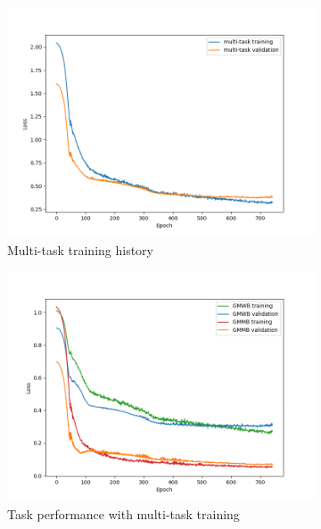 \begin{figure}[ht!]
    \centering
    \begin{subfigure}{0.48\textwidth}
        \includegraphics[width=\textwidth]{./project3/figures/figure5a.png}
        \caption{Multi-task training history} 
        \label{subfig3-5:multiTask}
    \end{subfigure}\hfill
    \begin{subfigure}{0.48\textwidth}
        \includegraphics[width=\textwidth]{./project3/figures/figure5b.png}
        \caption{Task performance with multi-task training}
        \label{subfig3-5:fineTuning}
    \end{subfigure}
    \begin{subfigure}{0.48\textwidth}

\end{subfigure}
\end{figure}
